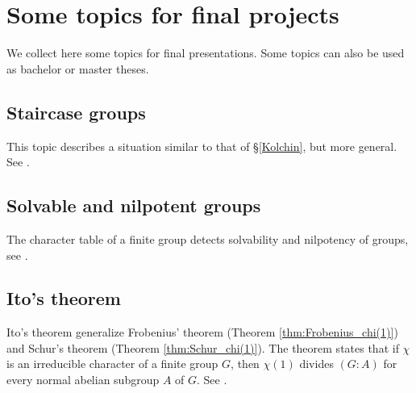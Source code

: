 \section*{Some topics for final projects}

\pagestyle{plain}
\fancyhf{}
\fancyfoot[CE,CO]{\leftmark}
\fancyfoot[LE,RO]{\thepage}

We collect here some topics for final presentations. Some topics
can also be used as bachelor or master theses. 

\subsection*{Staircase groups}

This topic describes a situation similar to that of \S\ref{Kolchin}, but
more general. See \cite[Chapter 5]{MR1369573}.

\subsection*{Solvable and nilpotent groups}

The character table of a finite group
detects solvability and nilpotency of groups, see
\cite[Chapter 6]{MR1369573}.





\subsection*{Ito's theorem}

Ito's theorem generalize Frobenius' theorem
(Theorem \ref{thm:Frobenius_chi(1)})  
and Schur's theorem (Theorem \ref{thm:Schur_chi(1)}). 
The theorem states that if $\chi$ is an irreducible character
of a finite group $G$, then $\chi(1)$ divides 
$(G:A)$ for every normal abelian subgroup $A$ of $G$. 
See \cite[\S8.1]{MR0450380}. 

